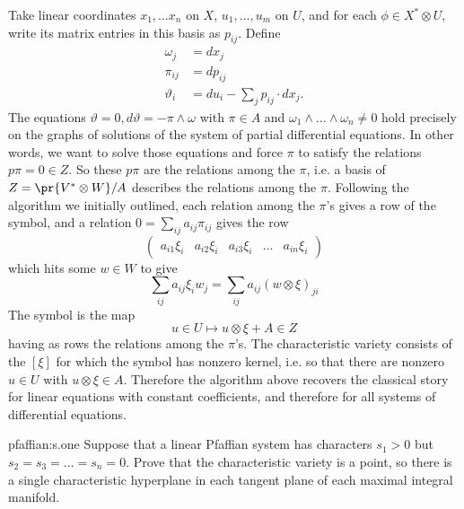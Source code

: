 Take linear coordinates \(x_1, \dots x_n\) on \(X\), \(u_1, \dots , u_m\) on \(U\), and for each \(\phi \in X^* \otimes U\), write its matrix entries in this basis as \(p_{ij}\).
Define
\begin{align*}
\omega_j &= dx_j \\
\pi_{ij} &= dp_{ij} \\
\vartheta_i &= du_i - \sum_j p_{ij} \cdot dx_j.
\end{align*}
The equations \(\vartheta = 0, d\vartheta = -\pi \wedge \omega\) with \(\pi \in A\) and \(\omega_1 \wedge \dots \wedge \omega_n \ne 0 \) hold precisely on the graphs of solutions of the system of partial differential equations.
In other words, we want to solve those equations and force \(\pi\) to satisfy the relations \(p \pi = 0 \in Z\).
So these \(p \pi\) are the relations among the \(\pi\), i.e. a basis of \(Z = \pr{V^* \otimes W}/A\)  describes the relations among the \(\pi\).
Following the algorithm we initially outlined, each relation among the \(\pi\)'s gives a row of the symbol, and a relation \(0=\sum_{ij} a_{ij} \pi_{ij}\) gives the row
\[
\begin{pmatrix}
a_{i1} \xi_i & a_{i2} \xi_i & a_{i3} \xi_i & \dots & a_{in} \xi_i
\end{pmatrix}
\]
which hits some \(w \in W\) to give
\[
\sum_{ij} a_{ij} \xi_i w_j = \sum_{ij} a_{ij} (w \otimes \xi)_{ji}
\]
The symbol is the map
\[
u \in U \mapsto u \otimes \xi + A \in Z
\]
having as rows the relations among the \(\pi\)'s.
The characteristic variety consists of the \([\xi]\) for which the symbol has nonzero kernel, i.e. so that there are nonzero \(u \in U\) with \(u \otimes \xi \in A\).
Therefore the algorithm above recovers the classical story for linear equations with constant coefficients, and therefore for all systems of differential equations.
\begin{problem}{pfaffian:s.one}
Suppose that a linear Pfaffian system has characters \(s_1>0\) but \(s_2=s_3=\dots=s_n=0\).
Prove that the characteristic variety is a point, so there is a single characteristic hyperplane in each tangent plane of each maximal integral manifold.
\end{problem}


